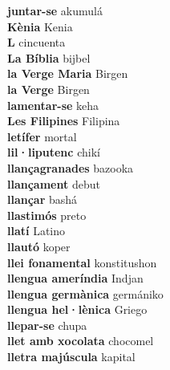 \textbf{ juntar-se  } akumulá \\
\textbf{ Kènia  } Kenia \\
\textbf{ L  } cincuenta \\
\textbf{ La Bíblia  } bijbel \\
\textbf{ la Verge Maria  } Birgen \\
\textbf{ la Verge  } Birgen \\
\textbf{ lamentar-se  } keha \\
\textbf{ Les Filipines  } Filipina \\
\textbf{ letífer  } mortal \\
\textbf{ lil·liputenc  } chikí \\
\textbf{ llançagranades  } bazooka \\
\textbf{ llançament  } debut \\
\textbf{ llançar  } bashá \\
\textbf{ llastimós  } preto \\
\textbf{ llatí  } Latino \\
\textbf{ llautó  } koper \\
\textbf{ llei fonamental  } konstitushon \\
\textbf{ llengua ameríndia  } Indjan \\
\textbf{ llengua germànica  } germániko \\
\textbf{ llengua hel·lènica  } Griego \\
\textbf{ llepar-se  } chupa \\
\textbf{ llet amb xocolata  } chocomel \\
\textbf{ lletra majúscula  } kapital \\
